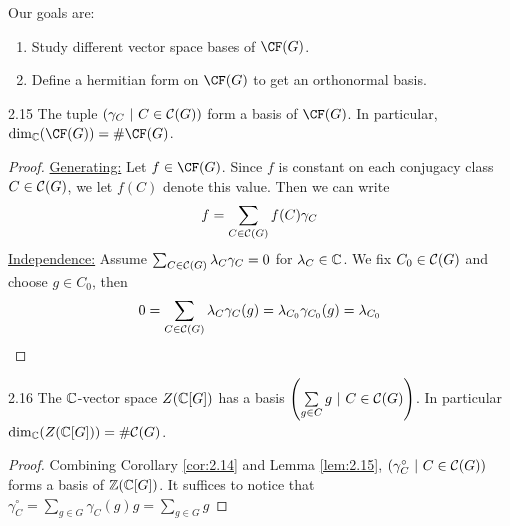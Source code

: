 \documentclass[twoside = false,	%
		headsepline,		%
		parskip = true,
		]{scrbook}						%
\begin{document}
    Our goals are:
    \begin{enumerate}
        \item Study different vector space bases of $\CF(G)$.
        \item Define a hermitian form on $\CF(G)$ to get an orthonormal basis.
    \end{enumerate}

    \begin{lemma}{}{2.15}
        The tuple $(\gamma_C \ | \ C \in \mathcal C(G))$ form a basis of $\CF(G)$. In particular, $\dim_\C(\CF(G)) = \# \CF(G)$.
    \end{lemma}
    \begin{proof}
        \underline{Generating:}
            Let $f \in \CF(G)$. Since $f$ is constant on each conjugacy class $C \in \mathcal C(G)$, we let $f(C)$ denote this value. Then we can write
            \begin{equation*}
                f = \sum_{C \in \mathcal C(G)} f(C) \gamma_C
            \end{equation*}
        \underline{Independence:}
            Assume $\sum_{C \in \mathcal C(G)} \lambda_C \gamma_C = 0$ for $\lambda_C \in \mathbb C$. We fix $C_0 \in \mathcal C(G)$ and choose $g \in C_0$, then
            \begin{equation*}
                0 = \sum_{C \in \mathcal C(G)} \lambda_C \gamma_C(g) = \lambda_{C_0} \gamma_{C_0}(g) = \lambda_{C_0}
            \end{equation*}
    \end{proof}
    \begin{corollary}{}{2.16}
        The $\mathbb C$-vector space $Z(\mathbb C[G])$ has a basis $\left( \sum\limits_{g \in C} g \ | \ C \in \mathcal C(G)\right)$. In particular $\dim_\mathbb C(Z(\mathbb C[G])) = \# \mathcal C(G)$.
    \end{corollary}
    \begin{proof}
        Combining Corollary \ref{cor:2.14} and Lemma \ref{lem:2.15}, $\left( \gamma_C^\circ \ | \ C \in \mathcal C(G)\right)$ forms a basis of $\mathbb Z(\mathbb C[G])$. It suffices to notice that $\gamma_C^\circ = \sum\limits_{g \in G} \gamma_C(g)g = \sum\limits_{g \in G} g$
    \end{proof}
\end{document}

